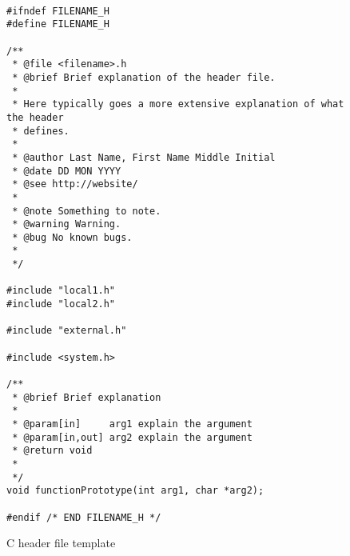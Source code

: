 \begin{figure}[htp]
	
\begin{vcode}
\begin{Verbatim}[frame=single,framesep=2mm,commandchars=\\\{\}]
				
#ifndef FILENAME_H
#define FILENAME_H

/**
 * @file <filename>.h
 * @brief Brief explanation of the header file.
 * 
 * Here typically goes a more extensive explanation of what the header
 * defines.
 * 
 * @author Last Name, First Name Middle Initial
 * @date DD MON YYYY
 * @see http://website/
 * 
 * @note Something to note.
 * @warning Warning.
 * @bug No known bugs.
 * 
 */

#include "local1.h"
#include "local2.h"

#include "external.h"

#include <system.h>

/**
 * @brief Brief explanation
 * 
 * @param[in]     arg1 explain the argument
 * @param[in,out] arg2 explain the argument
 * @return void
 * 
 */
void functionPrototype(int arg1, char *arg2);

#endif /* END FILENAME_H */

\end{Verbatim}
\end{vcode}

\caption{C header file template}
\label{fig:header_template}
\end{figure}